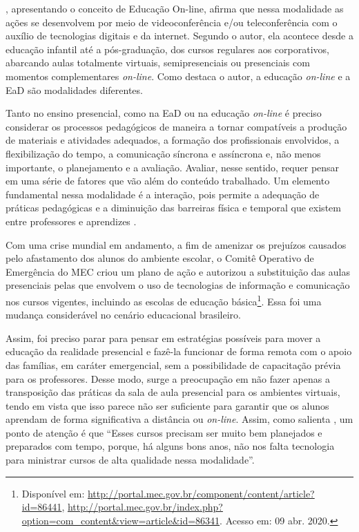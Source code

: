 \documentclass{textolivre}
\begin{document}
\textcite{moran_o_2003}, apresentando o conceito de Educação On-line, afirma que nessa modalidade as ações se desenvolvem por meio de videoconferência e/ou teleconferência com o auxílio de tecnologias digitais e da internet. Segundo o autor, ela acontece desde a educação infantil até a pós-graduação, dos cursos regulares aos corporativos, abarcando aulas totalmente virtuais, semipresenciais ou presenciais com momentos complementares \textit{on-line}. Como destaca o autor, a educação \textit{on-line} e a EaD são modalidades diferentes. 

Tanto no ensino presencial, como na EaD ou na educação \textit{on-line} é preciso considerar os processos pedagógicos de maneira a tornar compatíveis a produção de materiais e atividades adequados, a formação dos profissionais envolvidos, a flexibilização do tempo, a comunicação síncrona e assíncrona e, não menos importante, o planejamento e a avaliação. Avaliar, nesse sentido, requer pensar em uma série de fatores que vão além do conteúdo trabalhado. Um elemento fundamental nessa modalidade é a interação, pois permite a adequação de práticas pedagógicas e a diminuição das barreiras física e temporal que existem entre professores e aprendizes \cite{coscarelli_ensino_2020}.

Com uma crise mundial em andamento, a fim de amenizar os prejuízos causados pelo afastamento dos alunos do ambiente escolar, o Comitê Operativo de Emergência do MEC criou um plano de ação e autorizou a substituição das aulas presenciais pelas que envolvem o uso de tecnologias de informação e comunicação nos cursos vigentes, incluindo as escolas de educação básica\footnote{Disponível em: \url{http://portal.mec.gov.br/component/content/article?id=86441}, \url{http://portal.mec.gov.br/index.php?option=com_content&view=article&id=86341}. Acesso em: 09 abr. 2020.}. Essa foi uma mudança considerável no cenário educacional brasileiro.

Assim, foi preciso parar para pensar em estratégias possíveis para mover a educação da realidade presencial e fazê-la funcionar de forma remota com o apoio das famílias, em caráter emergencial, sem a possibilidade de capacitação prévia para os professores. Desse modo, surge a preocupação em não fazer apenas a transposição das práticas da sala de aula presencial para os ambientes virtuais, tendo em vista que isso parece não ser suficiente para garantir que os alunos aprendam de forma significativa a distância ou \textit{on-line}. Assim, como salienta \textcite[p. 15]{coscarelli_ensino_2020}, um ponto de atenção é que “Esses cursos precisam ser muito bem planejados e preparados com tempo, porque, há alguns bons anos, não nos falta tecnologia para ministrar cursos de alta qualidade nessa modalidade”. 
\end{document}
